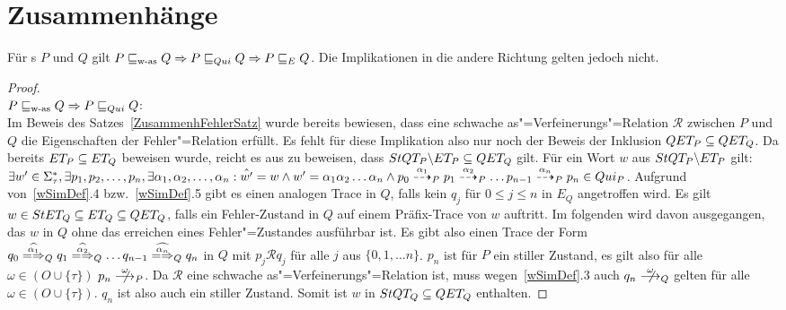 \section{Zusammenhänge}

\begin{Satz}
  \label{ZusammenhStilleSatz}
  Für \MEIO{}s $P$ und $Q$ gilt $P \sqsubseteq _{\mathrm{w}\text{-}\mathrm{as}} Q \Rightarrow P  \sqsubseteq  _{Qui} Q \Rightarrow
  P  \sqsubseteq  _E Q$. Die Implikationen in die andere Richtung gelten jedoch nicht.
\end{Satz}
\begin{proof}\mbox{}\\
  $P \sqsubseteq _{\mathrm{w}\text{-}\mathrm{as}} Q \Rightarrow P  \sqsubseteq  _{Qui} Q$:\\
  Im Beweis des Satzes~\ref{ZusammenhFehlerSatz} wurde bereits bewiesen, dass
  eine schwache as"=Verfeinerungs"=Relation $\mathcal{R}$ zwischen $P$ und $Q$
  die Eigenschaften der Fehler"=Relation \ERel{} erfüllt. Es fehlt für diese
  Implikation also nur noch der Beweis der Inklusion $QET _P \subseteq QET
  _Q$. Da bereits $ET _P\subseteq ET _Q$ beweisen wurde, reicht es aus zu
  beweisen, dass $StQT _P \backslash ET _P\subseteq QET _Q$ gilt. Für ein
  Wort $w$ aus $StQT _P \backslash ET _P$ gilt: $\exists w'\in\Sigma _{\tau}
  ^*, \exists p_1, p_2, \dots , p_n, \exists \alpha _1, \alpha _2, \dots
  ,\alpha _n: \hat{w'} = w \land w' = \alpha _1\alpha _2\dots\alpha _n \land
  p_0 \may[\alpha _1]_P p_1 \may[\alpha _2]_P \dots p_{n-1} \may[\alpha _n]_P
  p_n \in Qui _P$. Aufgrund von~\ref{wSimDef}.4 bzw.~\ref{wSimDef}.5 gibt es einen
  analogen Trace in $Q$, falls kein $q_j$ für $0\leq j \leq n$ in $E_Q$
  angetroffen wird. Es gilt $w\in StET _Q\subseteq ET _Q\subseteq QET _Q$,
  falls ein Fehler-Zustand in $Q$ auf einem Präfix-Trace von $w$ auftritt. Im
  folgenden wird davon ausgegangen, das $w$ in $Q$ ohne das erreichen eines
  Fehler"=Zustandes ausführbar ist. Es gibt also einen Trace der Form $q_0
  \weakmay[\widehat{\alpha _1}]_Q q_1 \weakmay[\widehat{\alpha _2}]_Q \dots
  q_{n-1} \weakmay[\widehat{\alpha _n}]_Q q_n$ in $Q$ mit $p_j \mathcal{R} q_j$
  für alle $j$ aus $\{0,1,\dots n\}$. $p_n$ ist für $P$ ein stiller Zustand, es
  gilt also für alle $\omega \in (O\cup \{\tau\})$ $p_n \nmust[\omega]_P$. Da
  $\mathcal{R}$ eine schwache as"=Verfeinerungs"=Relation ist, muss
  wegen~\ref{wSimDef}.3 auch $q_n \nmust[\omega]_Q$ gelten für alle $\omega
  \in (O\cup \{\tau\})$. $q_n$ ist also auch ein stiller Zustand. Somit ist $w$
  in $StQT _Q\subseteq QET _Q$ enthalten.


\end{proof}
